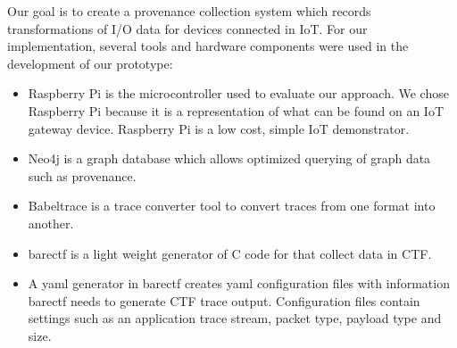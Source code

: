 \documentclass[conference]{IEEEtran}
\begin{document}
Our goal is to create a provenance collection system which records transformations of I/O data for devices connected in IoT. For our implementation, several tools and hardware components were used in the development of our prototype:

\begin{itemize}
\item Raspberry Pi is the microcontroller used to evaluate our approach. We chose Raspberry Pi because it is a representation of what can be found on an IoT gateway device. Raspberry Pi is a low cost, simple IoT demonstrator.


\item Neo4j is a graph database which allows optimized querying of graph data such as provenance.


\item Babeltrace is a trace converter tool to convert traces from one format into another. 

\item barectf is a light weight generator of C code for  that collect data in CTF. 

\item  A yaml generator in barectf creates yaml  configuration files with information barectf needs to generate CTF trace output. Configuration  files contain settings such as an application trace stream, packet type, payload type and size. 


\end{itemize}

%
%
%
\end{document}
